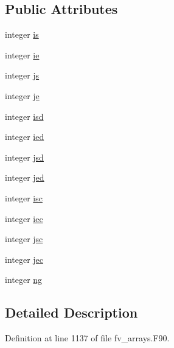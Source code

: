 \subsection*{Public Attributes}
\begin{DoxyCompactItemize}
\item 
integer \hyperlink{structfv__arrays__mod_1_1fv__grid__bounds__type_a84222fa7344fd5b1e3af3a1c1511edbe}{is}
\item 
integer \hyperlink{structfv__arrays__mod_1_1fv__grid__bounds__type_afc732fb72e7ed407d03d362c1f252eaf}{ie}
\item 
integer \hyperlink{structfv__arrays__mod_1_1fv__grid__bounds__type_a755478f8eccc59877e3214b449ba2fcd}{js}
\item 
integer \hyperlink{structfv__arrays__mod_1_1fv__grid__bounds__type_a6c45e731bc1722c4c3f8754603be8b14}{je}
\item 
integer \hyperlink{structfv__arrays__mod_1_1fv__grid__bounds__type_a093e99292611def96f8c93bded235b1e}{isd}
\item 
integer \hyperlink{structfv__arrays__mod_1_1fv__grid__bounds__type_a71ce775c34de50182a5a6bb3cf6a210f}{ied}
\item 
integer \hyperlink{structfv__arrays__mod_1_1fv__grid__bounds__type_aaa96d9e7589d89a41e1cd2d8d3dcae26}{jsd}
\item 
integer \hyperlink{structfv__arrays__mod_1_1fv__grid__bounds__type_a910777be14af374da071a7dbd9ea0d5b}{jed}
\item 
integer \hyperlink{structfv__arrays__mod_1_1fv__grid__bounds__type_a27c3ae729a8702577e90f5db757aeaf9}{isc}
\item 
integer \hyperlink{structfv__arrays__mod_1_1fv__grid__bounds__type_ad136ca077be35632ebe19800d59583da}{iec}
\item 
integer \hyperlink{structfv__arrays__mod_1_1fv__grid__bounds__type_a005eba777482ae89181b37df9abebf40}{jsc}
\item 
integer \hyperlink{structfv__arrays__mod_1_1fv__grid__bounds__type_af5a629cd73a6e44795ed193c783b23a9}{jec}
\item 
integer \hyperlink{structfv__arrays__mod_1_1fv__grid__bounds__type_a33323e415a0d78a74eec9a56dace6aea}{ng}
\end{DoxyCompactItemize}


\subsection{Detailed Description}


Definition at line 1137 of file fv\-\_\-arrays.\-F90.



